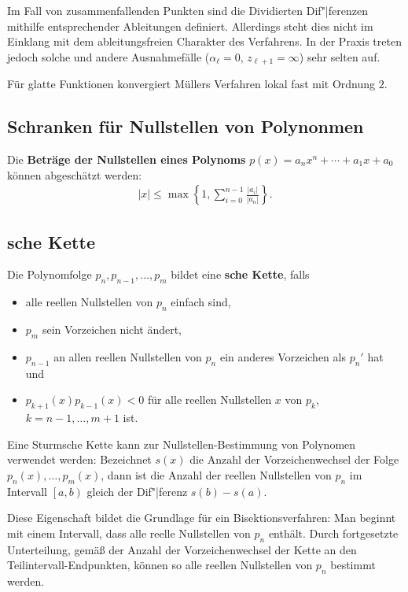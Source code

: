 Im Fall von zusammenfallenden Punkten sind die Dividierten Dif"|ferenzen
mithilfe entsprechender Ableitungen definiert.
Allerdings steht dies nicht im Einklang mit dem ableitungsfreien Charakter
des Verfahrens.
In der Praxis treten jedoch solche und andere Ausnahmefälle
($\alpha_\ell = 0$, $z_{\ell+1} = \infty$) sehr selten auf.

Für glatte Funktionen konvergiert Müllers Verfahren lokal fast mit Ordnung $2$.

\subsection{%
    Schranken für Nullstellen von Polynonmen%
}

Die \textbf{Beträge der Nullstellen eines Polynoms}
$p(x) = a_n x^n + \dotsb + a_1 x + a_0$ können abgeschätzt werden:
\begin{align*}
    |x| \le \max\left\{1, \sum_{i=0}^{n-1} \frac{|a_i|}{|a_n|}\right\}.
\end{align*}

\subsection{%
    sche Kette%
}

Die Polynomfolge $p_n, p_{n-1}, \dotsc, p_m$ bildet eine
\textbf{sche Kette}, falls
\begin{itemize}
    \item
    alle reellen Nullstellen von $p_n$ einfach sind,

    \item
    $p_m$ sein Vorzeichen nicht ändert,

    \item
    $p_{n-1}$ an allen reellen Nullstellen von $p_n$ ein anderes Vorzeichen
    als $p_n'$ hat und

    \item
    $p_{k+1}(x) p_{k-1}(x) < 0$ für alle reellen Nullstellen $x$ von $p_k$,
    $k = n - 1, \dotsc, m + 1$ ist.
\end{itemize}

Eine Sturmsche Kette kann zur Nullstellen-Bestimmung von Polynomen
verwendet werden:
Bezeichnet $s(x)$ die Anzahl der Vorzeichenwechsel der Folge
$p_n(x), \dotsc, p_m(x)$, dann ist die Anzahl der reellen Nullstellen von $p_n$
im Intervall $\left[a, b\right)$ gleich der Dif"|ferenz $s(b) - s(a)$.

Diese Eigenschaft bildet die Grundlage für ein Bisektionsverfahren:
Man beginnt mit einem Intervall, dass alle reelle Nullstellen von $p_n$
enthält.
Durch fortgesetzte Unterteilung, gemäß der Anzahl der Vorzeichenwechsel der
Kette an den Teilintervall-Endpunkten, können so alle reellen Nullstellen
von $p_n$ bestimmt werden.

